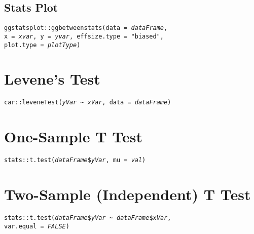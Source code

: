 \documentclass{tufte-handout}
\newenvironment{subs}
  {\adjustwidth{3em}{0pt}}
  {\endadjustwidth}
\begin{document}
\begin{subs}
\vspace{3mm}
\subsection{Stats Plot}
\noindent \texttt{ggstatsplot::}{\color{red}\texttt{ggbetweenstats}}\texttt{(data = \textit{dataFrame}, \\x = \textit{xvar}, y = \textit{yvar}, effsize.type = "biased", \\plot.type = \textit{plotType})}\\
\end{subs}


\vspace{5mm}
\section{Levene's Test}
\noindent \texttt{car::}{\color{red}\texttt{leveneTest}}\texttt{(\textit{yVar \textasciitilde\ xVar}, data = \textit{dataFrame})}\\

\vspace{5mm}
\section{One-Sample T Test}
\noindent \texttt{stats::}{\color{red}\texttt{t.test}}\texttt{(\textit{dataFrame}\$\textit{yVar}, mu = \textit{val})}\\

\vspace{5mm}
\section{Two-Sample (Independent) T Test}
\noindent \texttt{stats::}{\color{red}\texttt{t.test}}\texttt{(\textit{dataFrame}\$\textit{yVar} \textasciitilde\ \textit{dataFrame}\$\textit{xVar}, \\ var.equal = \textit{FALSE})}\\

\vspace{5mm}
\end{document}
